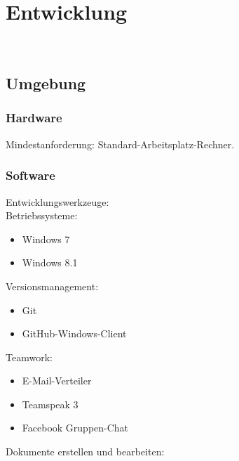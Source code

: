 %
%


\chapter{Entwicklung}
\label{EW}~\\


\section{Umgebung}
\label{EW:Umgebung}


\subsection{Hardware}


Mindestanforderung: Standard-Arbeitsplatz-Rechner.


\subsection{Software}

Entwicklungswerkzeuge:\\

Betriebssysteme:

\begin{itemize}

\item Windows 7
\item Windows 8.1

\end{itemize}

Versionsmanagement:

\begin{itemize}

\item Git
\item GitHub-Windows-Client

\end{itemize}

Teamwork:

\begin{itemize}

\item E-Mail-Verteiler
\item Teamspeak 3
\item Facebook Gruppen-Chat

\end{itemize}

Dokumente erstellen und bearbeiten:

